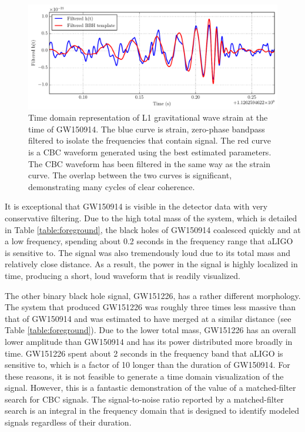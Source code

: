 \begin{figure}[ht!]
\includegraphics[width=\textwidth]{figures/O1/GW150914-timeseries}
\caption[GW150914 timeseries]{Time domain representation of L1 %
        gravitational wave strain at the time of GW150914. The blue %
        curve is strain, zero-phase bandpass filtered to isolate the %
        frequencies that contain signal. The red curve is a CBC waveform %
        generated using the best estimated parameters. The CBC waveform %
        has been filtered in the same way as the strain curve. The overlap %
        between the two curves is significant, demonstrating many cycles %
        of clear coherence.}
\label{fig:GW150914}
\end{figure}

It is exceptional that GW150914 is visible in the detector data with 
very conservative filtering. Due to the high total mass of the system, 
which is detailed in Table \ref{table:foreground}, the black holes 
of GW150914 coalesced quickly and at a low frequency, spending about 
0.2 seconds in the frequency range that aLIGO is sensitive to. The 
signal was also tremendously loud due to its total mass and relatively 
close distance. 
As a result, the power in the signal is highly localized in time, 
producing a short, loud waveform that is readily visualized.

The other binary black hole signal, GW151226, has a rather different 
morphology. The system that produced GW151226 was roughly three times 
less massive than that of GW150914 and was estimated to have merged 
at a similar distance (see Table \ref{table:foreground}). Due to the 
lower total mass, GW151226 has an overall lower amplitude than GW150914 
and has its power distributed more broadly in time. GW151226 spent about 
2 seconds in the frequency band that aLIGO is sensitive to, which is a 
factor of 10 longer than the duration of GW150914. For these reasons, 
it is not feasible to generate a time domain visualization of the signal. 
However, this is a fantastic demonstration of the value of a 
matched-filter search for CBC signals. The signal-to-noise ratio 
reported by a matched-filter search is an 
integral in the frequency domain that is designed to identify modeled 
signals regardless of their duration.

